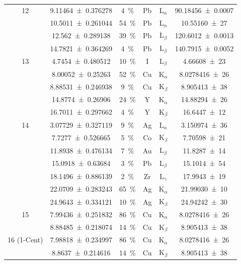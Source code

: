 \documentclass[
	a4paper,
	12pt,
	pagesize,
	ngerman
]{scrartcl}
\begin{document}
\begin{table}[H]
{\begin{tabular}{ c | c | c || c | c | c }
			12 
			& \SI{9.11464+-0.376278}{} &\SI{4}{\%}&Pb &L$_\alpha$&  \SI{9 .18456(70)    }{} \\ 
			& \SI{10.5011+-0.261044}{} &\SI{54}{\%}&Pb &L$_\alpha$&  \SI{10. 55160(27)     }{} \\
			& \SI{12.562+-0.289138}{} &\SI{39}{\%}&Pb &L$_\beta$&  \SI{ 12 .6012(13)     }{} \\
			& \SI{14.7821+-0.364269}{} &\SI{4}{\%}&Pb &L$_\beta$&  \SI{  14 .7915(52)    }{} \\
			\hline
			
			13 
			& \SI{4.7454+-0.480512}{} &\SI{10}{\%}& I & $\text{L}_\beta$ & \SI{4,66608(23)}{} \\
			& \SI{8.00052+-0.25263}{} &\SI{52}{\%}& Cu & $\text{K}_\alpha$ &  \SI{8,0278416(26)}{}\\
			& \SI{8.88531+-0.246938}{} &\SI{9}{\%}& Cu &  $\text{K}_\beta$ & \SI{8,905413(38)}{}\\
			& \SI{14.8774+-0.26906}{} &\SI{24}{\%}& Y & $\text{K}_\alpha$ & \SI{14,88294(26)}{} \\
			& \SI{16.7011+-0.297662}{} &\SI{4}{\%}& Y & $\text{K}_\beta$ &  \SI{16,6447(12)}{} \\ 
			\hline
			
			14 
			& \SI{3.07729+-0.327119}{} &\SI{9}{\%}&Ag &  $\text{L}_\alpha$ &  \SI{3,150974(36) }{} \\
			& \SI{7.7277+-0.526665}{} &\SI{5}{\%}& Co & $\text{K}_\beta$ &  \SI{7,70598(21)}{} \\
			& \SI{11.8938+-0.476134}{} &\SI{7}{\%}& Au & $\text{L}_\beta $ & \SI{11,8287(14) }{} \\
			& \SI{15.0918+-0.63684}{} &\SI{3}{\%}& Pb & $\text{L}_\beta $ &  \SI{15,1014(54)}{} \\
			& \SI{18.1496+-0.886139}{} &\SI{2}{\%}& Zr & $\text{L}_\gamma $ &  \SI{17,9943(19)}{} \\
			& \SI{22.0709+-0.283243}{} &\SI{65}{\%}&Ag & $\text{K}_\alpha$ &  \SI{21,99030(10)}{} \\
			& \SI{24.9643+-0.334121}{} &\SI{10}{\%}&Ag & $\text{K}_\beta$ &  \SI{24,94242(30)}{} \\ 
			\hline
			
			15 
			& \SI{7.99436+-0.251832}{} &\SI{86}{\%}& Cu & $\text{K}_\alpha$ &  \SI{8,0278416(26)}{} \\
			& \SI{8.88485+-0.218074}{} &\SI{14}{\%}&  Cu &  $\text{K}_\beta$ & \SI{8,905413(38)}{} \\ 
			\hline
			
			16 (1-Cent)
			& \SI{7.98818+-0.234997}{} &\SI{86}{\%}& Cu & $\text{K}_\alpha$ &  \SI{8,0278416(26)}{} \\
			& \SI{8.8637+-0.214616}{} &\SI{14}{\%}& Cu &  $\text{K}_\beta$ & \SI{8,905413(38)}{} \\ 
			\hline
			

\end{tabular}}
\end{table}
\end{document}
